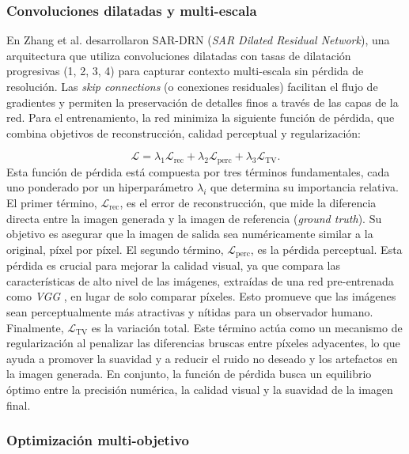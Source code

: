 \subsubsection{Convoluciones dilatadas y multi-escala}

En Zhang et al. \cite{zhang2018dilated} desarrollaron SAR-DRN (\emph{SAR Dilated Residual Network}), una arquitectura que utiliza convoluciones dilatadas con tasas de dilatación progresivas (1, 2, 3, 4) para capturar contexto multi-escala sin pérdida de resolución. Las \emph{skip connections} (o conexiones residuales) facilitan el flujo de gradientes y permiten la preservación de detalles finos a través de las capas de la red. Para el entrenamiento, la red minimiza la siguiente función de pérdida, que combina objetivos de reconstrucción, calidad perceptual y regularización:

\begin{equation}
	\mathcal{L} = \lambda_1 \mathcal{L}_{\text{rec}} + \lambda_2 \mathcal{L}_{\text{perc}} + \lambda_3 \mathcal{L}_{\text{TV}}.
\end{equation}
Esta función de pérdida está compuesta por tres términos fundamentales, cada uno ponderado por un hiperparámetro $\lambda_i$ que determina su importancia relativa. El primer término, $\mathcal{L}_{\text{rec}}$, es el error de reconstrucción, que mide la diferencia directa entre la imagen generada y la imagen de referencia (\emph{ground truth}). Su objetivo es asegurar que la imagen de salida sea numéricamente similar a la original, píxel por píxel. El segundo término, $\mathcal{L}_{\text{perc}}$, es la pérdida perceptual. Esta pérdida es crucial para mejorar la calidad visual, ya que compara las características de alto nivel de las imágenes, extraídas de una red pre-entrenada como \emph{VGG} \cite{simonyan2014very}, en lugar de solo comparar píxeles. Esto promueve que las imágenes sean perceptualmente más atractivas y nítidas para un observador humano. Finalmente, $\mathcal{L}_{\text{TV}}$ es la variación total. Este término actúa como un mecanismo de regularización al penalizar las diferencias bruscas entre píxeles adyacentes, lo que ayuda a promover la suavidad y a reducir el ruido no deseado y los artefactos en la imagen generada. En conjunto, la función de pérdida busca un equilibrio óptimo entre la precisión numérica, la calidad visual y la suavidad de la imagen final.

\subsubsection{Optimización multi-objetivo}

